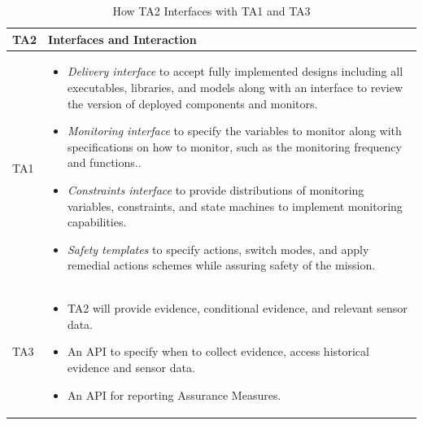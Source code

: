\begin{table}[ht]
\caption{How TA2 Interfaces with TA1 and TA3}
  \centering
  {\footnotesize
\begin{tabular}{|m{.25in}|m{5.90in}|} 
\hline
\textbf{TA2} & \textbf{Interfaces and Interaction} 
\\\hline
TA1 & 
\begin{itemize}[itemsep=0pt,leftmargin=*]
\item\textit{ Delivery interface} to accept fully implemented designs including all executables, libraries, and models along with an interface to review the version of deployed components and monitors.
\item \textit{Monitoring interface} to specify the variables to monitor along with specifications on how to monitor,  such as the monitoring frequency and functions..
\item \textit{Constraints interface} to provide distributions of monitoring variables, constraints, and state machines to implement monitoring capabilities.  
\item \textit{Safety templates} to specify  actions, switch modes, and apply remedial actions schemes while assuring safety of the mission.
\end{itemize} 
\\\hline
TA3 & 
\begin{itemize}[itemsep=0pt,leftmargin=*]
\item TA2 will provide  evidence, conditional evidence, and relevant sensor data.
\item An API to specify when to collect evidence, access historical evidence and sensor data.
\item An API for reporting  Assurance Measures.
\end{itemize}
\\\hline
\end{tabular}
}
\end{table}

